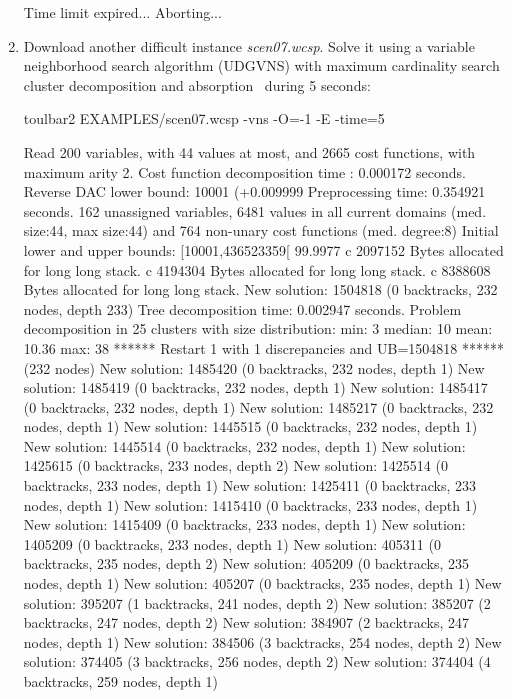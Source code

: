 \begin{enumerate}
{\begin{DoxyCode}
Time limit expired... Aborting...
\end{DoxyCode}}
\item Download another difficult instance {\em scen07.wcsp}. Solve it using a variable neighborhood search algorithm (UDGVNS) with maximum cardinality search cluster decomposition and absorption~\cite{Ouali17} during 5 seconds:
\begin{DoxyCode}
	toulbar2 EXAMPLES/scen07.wcsp -vns -O=-1 -E -time=5
\end{DoxyCode}
{\scriptsize
\begin{DoxyCode}
Read 200 variables, with 44 values at most, and 2665 cost functions, with maximum arity 2.
Cost function decomposition time : 0.000172 seconds.
Reverse DAC lower bound: 10001 (+0.009999%
Preprocessing time: 0.354921 seconds.
162 unassigned variables, 6481 values in all current domains (med. size:44, max size:44) and 764 non-unary cost functions (med. degree:8)
Initial lower and upper bounds: [10001,436523359[ 99.9977%
c 2097152 Bytes allocated for long long stack.
c 4194304 Bytes allocated for long long stack.
c 8388608 Bytes allocated for long long stack.
New solution: 1504818 (0 backtracks, 232 nodes, depth 233)
Tree decomposition time: 0.002947 seconds.
Problem decomposition in 25 clusters with size distribution: min: 3 median: 10 mean: 10.36 max: 38
****** Restart 1 with 1 discrepancies and UB=1504818 ****** (232 nodes)
New solution: 1485420 (0 backtracks, 232 nodes, depth 1)
New solution: 1485419 (0 backtracks, 232 nodes, depth 1)
New solution: 1485417 (0 backtracks, 232 nodes, depth 1)
New solution: 1485217 (0 backtracks, 232 nodes, depth 1)
New solution: 1445515 (0 backtracks, 232 nodes, depth 1)
New solution: 1445514 (0 backtracks, 232 nodes, depth 1)
New solution: 1425615 (0 backtracks, 233 nodes, depth 2)
New solution: 1425514 (0 backtracks, 233 nodes, depth 1)
New solution: 1425411 (0 backtracks, 233 nodes, depth 1)
New solution: 1415410 (0 backtracks, 233 nodes, depth 1)
New solution: 1415409 (0 backtracks, 233 nodes, depth 1)
New solution: 1405209 (0 backtracks, 233 nodes, depth 1)
New solution: 405311 (0 backtracks, 235 nodes, depth 2)
New solution: 405209 (0 backtracks, 235 nodes, depth 1)
New solution: 405207 (0 backtracks, 235 nodes, depth 1)
New solution: 395207 (1 backtracks, 241 nodes, depth 2)
New solution: 385207 (2 backtracks, 247 nodes, depth 2)
New solution: 384907 (2 backtracks, 247 nodes, depth 1)
New solution: 384506 (3 backtracks, 254 nodes, depth 2)
New solution: 374405 (3 backtracks, 256 nodes, depth 2)
New solution: 374404 (4 backtracks, 259 nodes, depth 1)

\end{DoxyCode}}
\end{enumerate}
